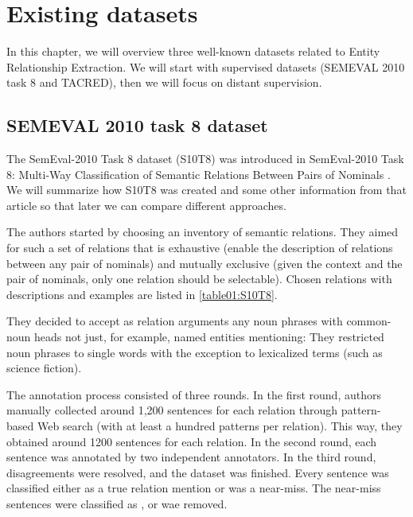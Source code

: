 \chapter{Existing datasets}

In this chapter, we will overview three well-known datasets related to Entity Relationship Extraction. We will start with supervised datasets (SEMEVAL 2010 task 8 and TACRED), then we will focus on distant supervision.


\section{SEMEVAL 2010 task 8 dataset}
The SemEval-2010 Task 8 dataset (S10T8) was introduced in SemEval-2010 Task 8: Multi-Way Classification of Semantic Relations Between Pairs of Nominals \cite{semeval}. We will summarize how S10T8 was created and some other information from that article so that later we can compare different approaches.


The authors started by choosing an inventory of semantic relations. They aimed for such a set of relations that is exhaustive (enable the description of relations between any pair of nominals) and mutually exclusive (given the context and the pair of nominals, only one relation should be selectable).  Chosen relations with descriptions and examples are listed in \autoref{table01:S10T8}. 


They decided to accept as relation arguments any noun phrases with common-noun heads not just, for example, named entities mentioning:     They restricted noun phrases to single words with the exception to lexicalized terms (such as  science fiction).

The annotation process consisted of three rounds. In the first round, authors manually collected around 1,200 sentences for each relation through pattern-based Web search (with at least a hundred patterns per relation). This way, they obtained around 1200 sentences for each relation. In the second round, each sentence was annotated by two independent annotators. In the third round, disagreements were resolved, and the dataset was finished. Every sentence was classified either as a true relation mention or was a  near-miss. The near-miss sentences were classified as , or wae removed.

